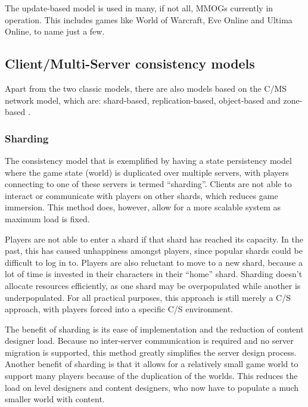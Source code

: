 \documentclass[10pt,a4paper,journal,cspaper,compsoc]{IEEEtran}
\begin{document}
The update-based model is used in many, if not all, MMOGs currently in operation. This includes games like World of Warcraft, Eve Online and Ultima
Online, to name just a few.

\subsection{Client/Multi-Server consistency models}
\label{cms_models}


Apart from the two classic models, there are also models based on the C/MS network model, which are: shard-based, replication-based, object-based and
zone-based \cite{Hu_voronoi_IM}.

\subsubsection{Sharding}

The consistency model that is exemplified by having a state persistency model where the game state (world) is duplicated over multiple servers, with
players connecting to one of these servers is termed ``sharding''. Clients are not able to interact or communicate with players on other shards,
which reduces game immersion. This method does, however, allow for a more scalable system as maximum load is fixed.

Players are not able to enter a shard if that shard has reached its capacity. In the past, this has caused unhappiness amongst players, since popular
shards could be difficult to log in to. Players are also reluctant to move to a new shard, because a lot of time is invested in their characters in
their ``home'' shard. Sharding doesn't allocate resources efficiently, as one shard may be overpopulated while another is underpopulated. For all
practical purposes, this approach is still merely a C/S approach, with players forced into a specific C/S environment.

The benefit of sharding is its ease of implementation and the reduction of content designer load. Because no inter-server communication is required
and no server migration is supported, this method greatly simplifies the server design process. Another benefit of sharding is that it allows for a
relatively small game world to support many players because of the duplication of the worlds. This reduces the load on level designers and content
designers, who now have to populate a much smaller world with content.
\end{document}
